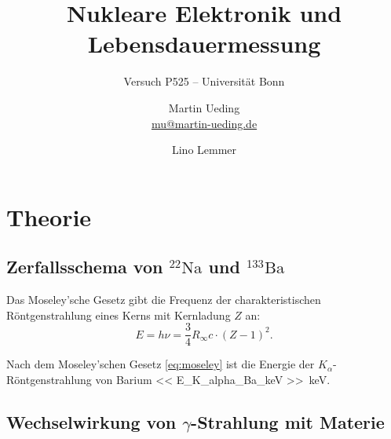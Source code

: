 

\usepackage{csquotes}

\usepackage{tikz}
\usetikzlibrary{chains}
\usetikzlibrary{shapes.geometric}

\usepackage{pgfplots}

\tikzexternalize

\usepackage{booktabs}

\hypersetup{
    pdftitle=
}

\subject{Praktikumsprotokoll}
\title{Nukleare Elektronik und Lebensdauermessung}
\subtitle{Versuch P525 -- Universität Bonn}
\author{
    Martin Ueding \\ \small{\href{mailto:mu@martin-ueding.de}{mu@martin-ueding.de}}
    \and
    Lino Lemmer
}
\publishers{Tutor: Damian-Maria Piontek}



\maketitle

\tableofcontents

\chapter{Theorie}

\section{Zerfallsschema von ${}^{22}\text{Na}$ und ${}^{133}\text{Ba}$}

Das Moseley'sche Gesetz gibt die Frequenz der charakteristischen
Röntgenstrahlung eines Kerns mit Kernladung $Z$ an:
\parencite[(17.10)]{meschede-gerthsen_24}
\begin{equation}
    \label{eq:moseley}
    E = h \nu = \frac 34 R_\infty c \cdot (Z - 1)^2.
\end{equation}

Nach dem Moseley'schen Gesetz \eqref{eq:moseley} ist die Energie der
$K_\alpha$-Röntgenstrahlung von Barium \SI{<< E_K_alpha_Ba_keV
>>}{\kilo\electronvolt}.

\section{Wechselwirkung von $\gamma$-Strahlung mit Materie}

